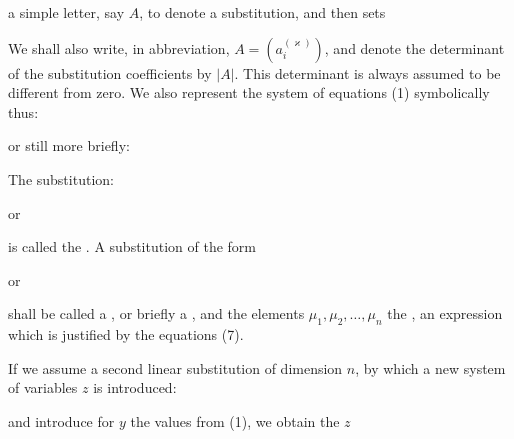 a simple letter, say $A$, to denote a substitution, and then sets


We shall also write, in abbreviation, $A = (a_i^{(\varkappa)})$, and denote the determinant of the substitution coefficients by $|A|$. This determinant is always assumed to be different from zero. We also represent the system of equations (1) symbolically thus:


or still more briefly:


The substitution:


or


is called the . A substitution of the form


or


shall be called a , or briefly a , and the elements $\mu_1, \mu_2, \dots, \mu_n$ the , an expression which is justified by the equations (7).

If we assume a second linear substitution of dimension $n$, by which a new system of variables $z$ is introduced:


and introduce for $y$ the values from (1), we obtain the $z$
